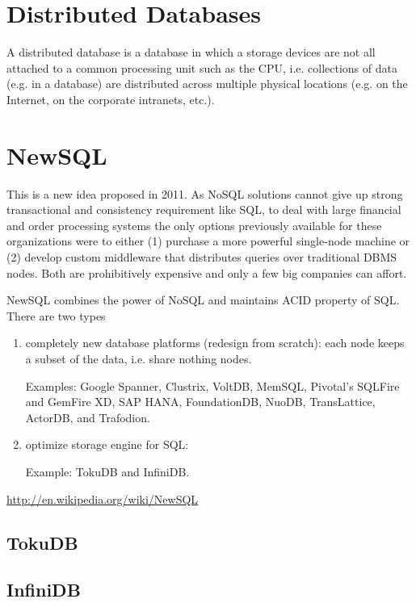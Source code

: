 \section{Distributed Databases}

A distributed database is a database in which a storage devices are not all
attached to a common processing unit such as the CPU, i.e. 
collections of data (e.g. in a database) are distributed across multiple
physical locations (e.g. on the Internet, on the corporate intranets, etc.).

\section{NewSQL}
\label{sec:NewSQL_database}

This is a new idea proposed in 2011. As NoSQL solutions cannot give up strong
transactional and consistency requirement like SQL, to deal with large financial
and order processing systems the only options previously available for these
organizations were to either (1) purchase a more powerful single-node machine or
(2) develop custom middleware that distributes queries over traditional DBMS
nodes. Both are prohibitively expensive and only a few big companies can affort.

NewSQL combines the power of NoSQL and maintains ACID property of SQL.
There are two types
\begin{enumerate}
  \item  completely new database platforms (redesign from scratch): each node
  keeps a subset of the data, i.e. share nothing nodes. 
  
  Examples: 
   Google Spanner, Clustrix, VoltDB, MemSQL, Pivotal's SQLFire and GemFire XD,
  SAP HANA, FoundationDB, NuoDB, TransLattice, ActorDB, and Trafodion.
  
  \item optimize storage engine for SQL: 
  
  Example:  TokuDB and InfiniDB.
\end{enumerate}

\url{http://en.wikipedia.org/wiki/NewSQL}

\subsection{TokuDB}
\label{sec:TokuDB}

\subsection{InfiniDB}
\label{sec:InfiniDB}

